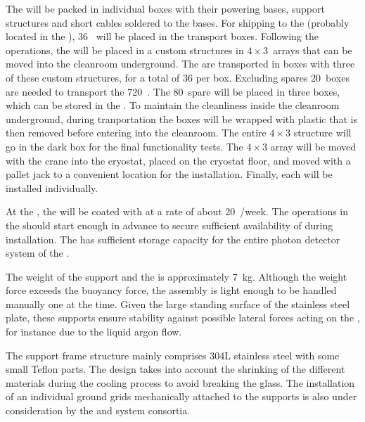 The  will be packed in individual boxes with their powering bases, support structures and short  cables soldered to the bases.
For shipping to the  (probably located in the ), 36~ will  be placed in the transport boxes.
Following the  operations, the  will be placed in a custom structures in $4 \times 3$~arrays that can be moved into the cleanroom underground.
The  are transported in boxes with three of these custom structures, for a total of 36 per box.
Excluding spares 20~boxes are needed to transport the 720~.
The 80~spare  will be placed in three boxes, which can be stored in the .
To maintain the cleanliness inside the cleanroom underground, during tranportation the boxes will be wrapped with plastic that is then removed before entering into the cleanroom.
The entire $4 \times 3$ structure will go in the dark box for the final functionality tests.
The $4 \times 3$ array will be moved with the crane into the cryostat, placed on the cryostat floor, and moved with a pallet jack to a convenient location for the installation. Finally, each  will be installed individually.

At the , the  will be coated with  at a rate of about 20~/week.
The operations in the  should start enough in advance to secure sufficient availability of  during installation.
The  has sufficient storage capacity for the entire photon detector system of the .

The weight of the support and the  is approximately 7~kg.
Although the weight force exceeds the buoyancy force, the assembly is light enough to be handled manually one at the time. 
Given the large standing surface of the stainless steel plate, these supports ensure stability against possible lateral forces acting on the , for instance due to the liquid argon flow.

The support frame structure mainly comprises 304L stainless steel with some small Teflon parts.
The design takes into account the shrinking of the different materials during the cooling process to avoid breaking the  glass.
The installation of an individual ground grids mechanically attached to the  supports is also under consideration by the  and  system consortia.


